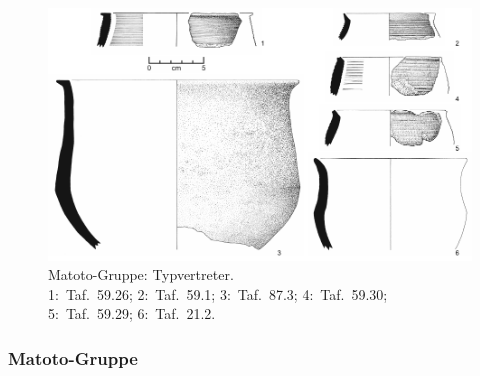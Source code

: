 \begin{figure}[tb]
	\begin{minipage}[b]{.8\textwidth}
		\includegraphics[width=.95\textwidth]{fig/MAT-Typen.pdf}
	\end{minipage}\hfill
	\begin{minipage}[b]{.2\textwidth}
		\caption{Matoto-Gruppe: Typvertreter.\\1:~Taf.~59.26; 2:~Taf.~59.1; 3:~Taf.~87.3; 4:~Taf.~59.30; 5:~Taf.~59.29; 6:~Taf.~21.2.}
		\label{fig:MAT_Typvertreter}
	\end{minipage}
\end{figure}

\subsubsection{Matoto-Gruppe}\label{sec:MAT-Gr}

